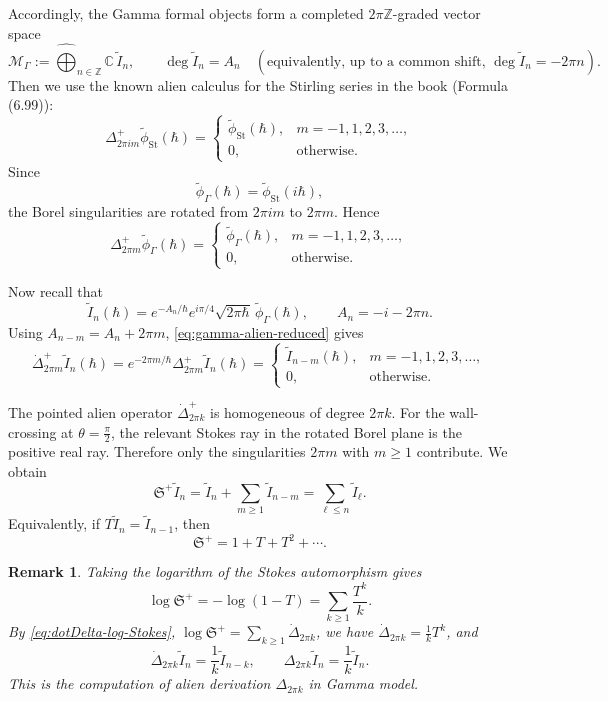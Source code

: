 \documentclass[11pt]{amsart}
\theoremstyle{plain}
\newtheorem{rmk}[thm]{Remark}
\newcommand{\C}{\mathbb C}
\begin{document}
Accordingly, the Gamma formal objects form a completed \(2\pi\mathbb Z\)-graded vector space
\[
\mathcal M_\Gamma
:=
\widehat{\bigoplus}_{n\in\mathbb Z}\C\,\widetilde I_n,
\qquad
\deg \widetilde I_n=A_n
\quad
(\text{equivalently, up to a common shift, } \deg \widetilde I_n=-2\pi n).
\]
Then we use the known alien calculus for the Stirling series in the book \cite{MitschiSauzin2016} (Formula (6.99)):
\[
\Delta^+_{2\pi i m}\widetilde\phi_{\mathrm{St}}(\hbar)
=
\begin{cases}
\widetilde\phi_{\mathrm{St}}(\hbar), & m=-1,1,2,3,\ldots,\\
0, & \text{otherwise}.
\end{cases}
\]
Since
\[
\widetilde\phi_\Gamma(\hbar)=\widetilde\phi_{\mathrm{St}}(i\hbar),
\]
the Borel singularities are rotated from \(2\pi i m\) to \(2\pi m\). Hence
\begin{equation}\label{eq:gamma-alien-reduced}
\Delta^+_{2\pi m}\widetilde\phi_\Gamma(\hbar)
=
\begin{cases}
\widetilde\phi_\Gamma(\hbar), & m=-1,1,2,3,\ldots,\\
0, & \text{otherwise}.
\end{cases}
\end{equation}

Now recall that
\[
\widetilde I_n(\hbar)
=
e^{-A_n/\hbar}
e^{i\pi/4}\sqrt{2\pi\hbar}\,
\widetilde\phi_\Gamma(\hbar),
\qquad
A_n=-i-2\pi n.
\]
Using \(A_{n-m}=A_n+2\pi m\), \eqref{eq:gamma-alien-reduced} gives
\begin{equation}\label{eq:gamma-dot-alien-full}
\dot\Delta^+_{2\pi m}\widetilde I_n(\hbar)
=
e^{-2\pi m/\hbar}\Delta^+_{2\pi m}\widetilde I_n(\hbar)
=
\begin{cases}
\widetilde I_{n-m}(\hbar), & m=-1,1,2,3,\ldots,\\
0, & \text{otherwise}.
\end{cases}
\end{equation}

The pointed alien operator \(\dot\Delta_{2\pi k}^+\) is
homogeneous of degree \(2\pi k\). For the wall-crossing at \(\theta=\frac{\pi}{2}\), the relevant Stokes ray in the rotated Borel plane is the positive real ray.  Therefore only the singularities \(2\pi m\) with \(m\ge1\) contribute. We obtain
\begin{equation*}\label{eq:gamma-stokes-auto-positive}
\mathfrak S^+\widetilde I_n
=
\widetilde I_n+\sum_{m\ge1}\widetilde I_{n-m}
=
\sum_{\ell\le n}\widetilde I_\ell.
\end{equation*}
Equivalently, if \(T\widetilde I_n=\widetilde I_{n-1}\), then
\[
\mathfrak S^+=1+T+T^2+\cdots .
\]
\begin{rmk}
Taking the logarithm of the Stokes automorphism gives
\[
\log\mathfrak S^+
=
-\log(1-T)
=
\sum_{k\ge1}\frac{T^k}{k}.\]
By \eqref{eq:dotDelta-log-Stokes},
$\log\mathfrak S^+=\sum_{k\ge1}\dot\Delta_{2\pi k}$, we have $\dot\Delta_{2\pi k}=\frac1kT^k$, and
\[
\dot\Delta_{2\pi k}\widetilde I_n
=
\frac1k\widetilde I_{n-k},
\qquad
\Delta_{2\pi k}\widetilde I_n
=
\frac1k\widetilde I_n.
\]
This is the computation of alien derivation $\Delta_{2\pi k}$ in Gamma model.
\end{rmk}
\end{document}
